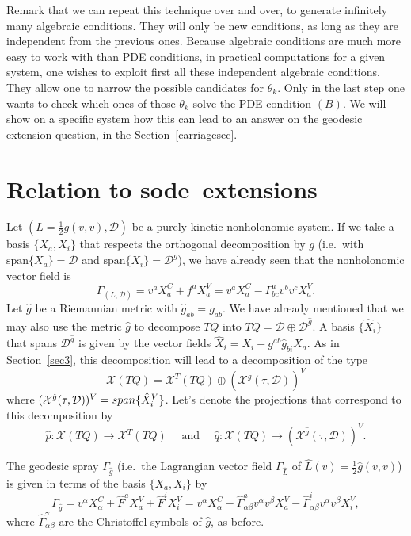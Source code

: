 \documentclass[11pt]{article}
\def\sode{{\sc sode}}
\def\D{{\mathcal D}}
\def\GLD{{\Gamma_{(L,\mathcal{D})}}}
\begin{document}
{Remark that we can repeat this technique over and over, to generate infinitely many algebraic conditions. They will only be new conditions, as long as they are independent from the previous ones. Because algebraic conditions are much more easy to work with than PDE conditions, in practical computations for a given system, one wishes to exploit first all these independent algebraic conditions. They allow one to narrow the possible candidates for $\theta_k$. Only in the last step one wants to check which ones of those $\theta_k$ solve the PDE condition $(B)$. We will show on a specific system how this can lead to an answer on the geodesic extension question, in the Section~\ref{carriagesec}.}


\section{Relation to \sode\ extensions} \label{sec5}

Let $(L=\frac{1}{2}g(v,v),\D)$ be a purely kinetic nonholonomic system. If we take a basis $\{X_a,X_i\}$ that respects the orthogonal decomposition by $g$ (i.e.\ with $\text{span}\{X_a\}=\mathcal{D}$ and $\text{span}\{X_i\}=\mathcal{D}^g$), we have already seen that the  nonholonomic vector field is
\[
\GLD=v^a X_a^C + f^a X_a^V = v^a X_a^C  -\Gamma_{bc}^av^bv^c X_a^V.
\]
Let   $\hat{g}$ be a Riemannian metric with $\hat{g}_{ab}=g_{ab}$. We have already mentioned that we may also use the metric  $\hat{g}$ to decompose $TQ$ into $TQ=\mathcal{D}\oplus {\D}^{\hat g}$. A basis  $\{\hat{X}_i\}$ that spans $ {\mathcal{D}}^{\hat g}$ is given by the vector fields $\hat{X}_i=X_i-{g}^{a b} \hat{g}_{b i} X_a$.
As in Section~\ref{sec3}, this decomposition will lead to a decomposition of the type 
\[
{\mathcal X}(TQ)={\mathcal X}^T(TQ)\oplus ({\mathcal X}^{\hat g}(\tau,\D))^V
\]
where  $({\mathcal X}^{\hat g}(\tau,\D))^V={\rm span}\{\hat{X}_i^V\}$.
Let's denote the projections that correspond to this  decomposition by   
$$ 
\hat{p}:\mathcal{X}(TQ)\rightarrow    {\mathcal X}^T(TQ) \quad\text{ and }\quad \hat{q}:\mathcal{X}(TQ) \rightarrow ({\mathcal X}^{\hat g}(\tau,\D))^V.
$$


The geodesic spray $\Gamma_{\hat g}$ (i.e.\ the  Lagrangian vector field $\Gamma_{\hat L}$ of $\hat{L}(v)=\frac{1}{2}\hat{g}(v,v)$) is given in terms of the basis $\{X_a,X_i\}$ by 
\[
 \Gamma_{\hat{g}}=v^\alpha X_\alpha^C+\hat{F}^a X_a^V+\hat{F}^i X_i^V = v^\alpha X_\alpha^C- {\hat{\Gamma}}^a_{\alpha\beta}v^\alpha v^\beta X_a^V-{\hat{\Gamma}}^i_{\alpha\beta}v^\alpha v^\beta X_i^V,
\]
where $\hat{\Gamma}^\gamma_{\alpha\beta}$ are the Christoffel symbols of $\hat{g}$, as before. 
\end{document}
